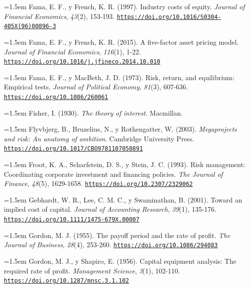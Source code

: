 \documentclass[10pt,a4paper]{article}
\begin{document}
\noindent\hangindent=1.5em Fama, E. F., y French, K. R. (1997). Industry costs of equity. \textit{Journal of Financial Economics}, \textit{43}(2), 153-193. \href{https://doi.org/10.1016/S0304-405X(96)00896-3}{\nolinkurl{https://doi.org/10.1016/S0304-405X(96)00896-3}}

\noindent\hangindent=1.5em Fama, E. F., y French, K. R. (2015). A five-factor asset pricing model. \textit{Journal of Financial Economics}, \textit{116}(1), 1-22. \href{https://doi.org/10.1016/j.jfineco.2014.10.010}{\nolinkurl{https://doi.org/10.1016/j.jfineco.2014.10.010}}

\noindent\hangindent=1.5em Fama, E. F., y MacBeth, J. D. (1973). Risk, return, and equilibrium: Empirical tests. \textit{Journal of Political Economy}, \textit{81}(3), 607-636. \href{https://doi.org/10.1086/260061}{\nolinkurl{https://doi.org/10.1086/260061}}

\noindent\hangindent=1.5em Fisher, I. (1930). \textit{The theory of interest}. Macmillan.

\noindent\hangindent=1.5em Flyvbjerg, B., Bruzelius, N., y Rothengatter, W. (2003). \textit{Megaprojects and risk: An anatomy of ambition}. Cambridge University Press. \href{https://doi.org/10.1017/CBO9781107050891}{\nolinkurl{https://doi.org/10.1017/CBO9781107050891}}

\noindent\hangindent=1.5em Froot, K. A., Scharfstein, D. S., y Stein, J. C. (1993). Risk management: Coordinating corporate investment and financing policies. \textit{The Journal of Finance}, \textit{48}(5), 1629-1658. \href{https://doi.org/10.2307/2329062}{\nolinkurl{https://doi.org/10.2307/2329062}}

\noindent\hangindent=1.5em Gebhardt, W. R., Lee, C. M. C., y Swaminathan, B. (2001). Toward an implied cost of capital. \textit{Journal of Accounting Research}, \textit{39}(1), 135-176. \href{https://doi.org/10.1111/1475-679X.00007}{\nolinkurl{https://doi.org/10.1111/1475-679X.00007}}

\noindent\hangindent=1.5em Gordon, M. J. (1955). The payoff period and the rate of profit. \textit{The Journal of Business}, \textit{28}(4), 253-260. \href{https://doi.org/10.1086/294083}{\nolinkurl{https://doi.org/10.1086/294083}}

\noindent\hangindent=1.5em Gordon, M. J., y Shapiro, E. (1956). Capital equipment analysis: The required rate of profit. \textit{Management Science}, \textit{3}(1), 102-110. \href{https://doi.org/10.1287/mnsc.3.1.102}{\nolinkurl{https://doi.org/10.1287/mnsc.3.1.102}}
\end{document}
